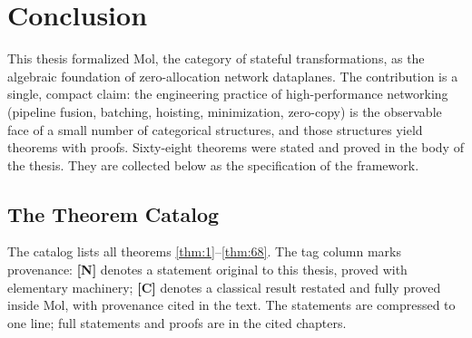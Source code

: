\chapter{Conclusion}\label{ch:conclusion}

This thesis formalized Mol, the category of stateful transformations, as the algebraic foundation of zero-allocation network dataplanes. The contribution is a single, compact claim: the engineering practice of high-performance networking (pipeline fusion, batching, hoisting, minimization, zero-copy) is the observable face of a small number of categorical structures, and those structures yield theorems with proofs. Sixty-eight theorems were stated and proved in the body of the thesis. They are collected below as the specification of the framework.

\section{The Theorem Catalog}
The catalog lists all theorems \autoref{thm:1}--\autoref{thm:68}. The tag column marks provenance: \textbf{[N]} denotes a statement original to this thesis, proved with elementary machinery; \textbf{[C]} denotes a classical result restated and fully proved inside Mol, with provenance cited in the text. The statements are compressed to one line; full statements and proofs are in the cited chapters.

